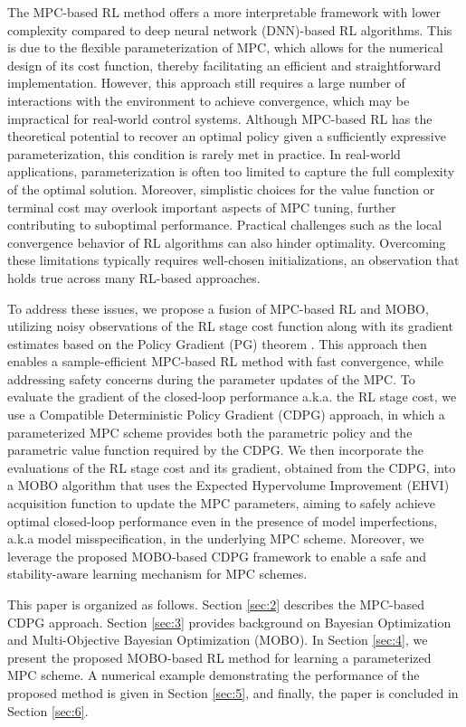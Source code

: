 \documentclass[10pt,twocolumn,twoside]{IEEEtran}
\begin{document}
The MPC-based RL method offers a more interpretable framework with lower complexity compared to deep neural network (DNN)-based RL algorithms. This is due to the flexible parameterization of MPC, which allows for the numerical design of its cost function, thereby facilitating an efficient and straightforward implementation. However, this approach still requires a large number of interactions with the environment to achieve convergence, which may be impractical for real-world control systems. Although MPC-based RL has the theoretical potential to recover an optimal policy given a sufficiently expressive parameterization, this condition is rarely met in practice. In real-world applications, parameterization is often too limited to capture the full complexity of the optimal solution. Moreover, simplistic choices for the value function or terminal cost may overlook important aspects of MPC tuning, further contributing to suboptimal performance. Practical challenges such as the local convergence behavior of RL algorithms can also hinder optimality. Overcoming these limitations typically requires well-chosen initializations, an observation that holds true across many RL-based approaches.

To address these issues, we propose a fusion of MPC-based RL and MOBO, utilizing noisy observations of the RL stage cost function along with its gradient estimates based on the Policy Gradient (PG) theorem \cite{silver2014deterministic}. This approach then enables a sample-efficient MPC-based RL method with fast convergence, while addressing safety concerns during the parameter updates of the MPC. To evaluate the gradient of the closed-loop performance a.k.a. the RL stage cost, we use a Compatible Deterministic Policy Gradient (CDPG) approach, in which a parameterized MPC scheme provides both the parametric policy and the parametric value function required by the CDPG. We then incorporate the evaluations of the RL stage cost and its gradient, obtained from the CDPG, into a MOBO algorithm that uses the Expected Hypervolume Improvement (EHVI) acquisition function to update the MPC parameters, aiming to safely achieve optimal closed-loop performance even in the presence of model imperfections, a.k.a model misspecification, in the underlying MPC scheme. Moreover, we leverage the proposed MOBO-based CDPG framework to enable a safe and stability-aware learning mechanism for MPC schemes.

This paper is organized as follows. Section \ref{sec:2} describes the MPC-based CDPG approach. Section \ref{sec:3} provides background on Bayesian Optimization and Multi-Objective Bayesian Optimization (MOBO). In Section \ref{sec:4}, we present the proposed MOBO-based RL method for learning a parameterized MPC scheme. A numerical example demonstrating the performance of the proposed method is given in Section \ref{sec:5}, and finally, the paper is concluded in Section \ref{sec:6}. 
\end{document}
